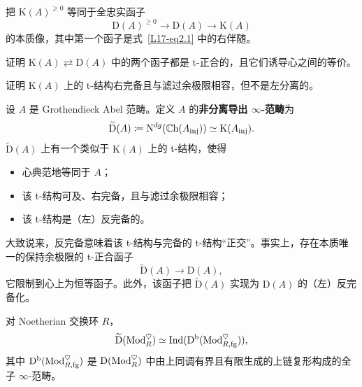 \begin{exercise}\label{L17-3.19}
把 $\mathrm{K}(A)^{\ge0}$ 等同于全忠实函子
\[
\mathrm{D}(A)^{\ge0}\to\mathrm{D}(A)\to\mathrm{K}(A)
\]
的本质像，其中第一个函子是式~\eqref{L17-eq2.1} 中的右伴随。
\end{exercise}

\begin{exercise}\label{L17-3.20}
证明 $\mathrm{K}(A)\rightleftarrows\mathrm{D}(A)$ 中的两个函子都是 t-正合的，且它们诱导心之间的等价。
\end{exercise}

\begin{exercise}\label{L17-3.21}
证明 $\mathrm{K}(A)$ 上的 t-结构右完备且与滤过余极限相容，但不是左分离的。
\end{exercise}


\begin{construction}\label{L17-A.1}
设 $A$ 是 Grothendieck Abel 范畴。定义 $A$ 的\textbf{非分离导出 $\infty$-范畴}为
\[
\widetilde{\mathrm{D}}(A)\coloneqq\mathrm{N}^{dg}(\mathbb{C}\mathrm{h}(A_{\mathrm{inj}}))\simeq\mathrm{K}(A_{\mathrm{inj}}).
\]
$\widetilde{\mathrm{D}}(A)$ 上有一个类似于 $\mathrm{K}(A)$ 上的 t-结构，使得
\begin{itemize}[leftmargin=2.2em,itemsep=0.1em]
\item 心典范地等同于 $A$；
\item 该 t-结构可及、右完备，且与滤过余极限相容；
\item 该 t-结构是（左）反完备的。
\end{itemize}
\end{construction}

\begin{remark}\label{L17-A.2}
大致说来，反完备意味着该 t-结构与完备的 t-结构“正交”。事实上，存在本质唯一的保持余极限的 t-正合函子
\[
\widetilde{\mathrm{D}}(A)\to\mathrm{D}(A),
\]
它限制到心上为恒等函子。此外，该函子把 $\widetilde{\mathrm{D}}(A)$ 实现为 $\mathrm{D}(A)$ 的（左）反完备化。
\end{remark}

\begin{example}\label{L17-A.3}
对 Noetherian 交换环 $R$，
\[
\widetilde{\mathrm{D}}(\operatorname{Mod}_R^{\heartsuit})\simeq\operatorname{Ind}(\mathrm{D}^{\mathrm{b}}(\operatorname{Mod}_{R,\mathrm{fg}}^{\heartsuit})),
\]
其中 $\mathrm{D}^{\mathrm{b}}(\operatorname{Mod}_{R,\mathrm{fg}}^{\heartsuit})$ 是 $\mathrm{D}(\operatorname{Mod}_R^{\heartsuit})$ 中由上同调有界且有限生成的上链复形构成的全子 $\infty$-范畴。
\end{example}

